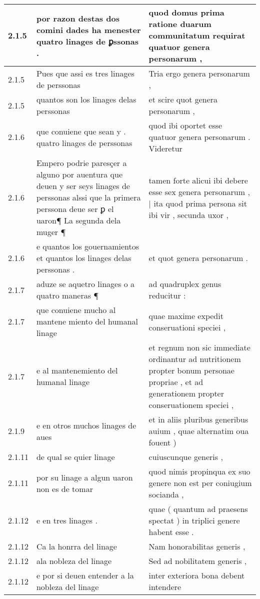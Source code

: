 \begin{tabular}{|p{1cm}|p{6.5cm}|p{6.5cm}|}
2.1.5 & por razon destas dos comini dades ha menester quatro linages de ꝑssonas . & quod domus prima ratione duarum communitatum requirat quatuor genera personarum , \\\hline
2.1.5 & Pues que assi es tres linages de perssonas & Tria ergo genera personarum , \\\hline
2.1.5 & quantos son los linages delas perssonas & et scire quot genera personarum , \\\hline
2.1.6 & que conuiene que sean y . quatro linages de perssonas & quod ibi oportet esse quatuor genera personarum . Videretur \\\hline
2.1.6 & Empero podrie paresçer a alguno por auentura que deuen y ser seys linages de perssonas alssi que la primera perssona deue ser ꝑ el uaron¶ La segunda dela muger ¶ & tamen forte alicui ibi debere esse sex genera personarum , | ita quod prima persona sit ibi vir , secunda uxor , \\\hline
2.1.6 & e quantos los gouernamientos et quantos los linages delas perssonas . & et quot genera personarum . \\\hline
2.1.7 & aduze se aquetro linages o a quatro maneras ¶ & ad quadruplex genus reducitur : \\\hline
2.1.7 & que conuiene mucho al mantene miento del humanal linage & quae maxime expedit conseruationi speciei , \\\hline
2.1.7 & e al mantenemiento del humanal linage & et regnum non sic immediate ordinantur ad nutritionem propter bonum personae propriae , et ad generationem propter conseruationem speciei , \\\hline
2.1.9 & e en otros muchos linages de aues & et in aliis pluribus generibus auium , quae alternatim oua fouent ) \\\hline
2.1.11 & de qual se quier linage & cuiuscunque generis , \\\hline
2.1.11 & por su linage a algun uaron non es de tomar & quod nimis propinqua ex suo genere non est per coniugium socianda , \\\hline
2.1.12 & e en tres linages . & quae ( quantum ad praesens spectat ) in triplici genere habent esse . \\\hline
2.1.12 & Ca la honrra del linage & Nam honorabilitas generis , \\\hline
2.1.12 & ala nobleza del linage & Sed ad nobilitatem generis , \\\hline
2.1.12 & e por si deuen entender a la nobleza del linage & inter exteriora bona debent intendere \\\hline

\end{tabular}
